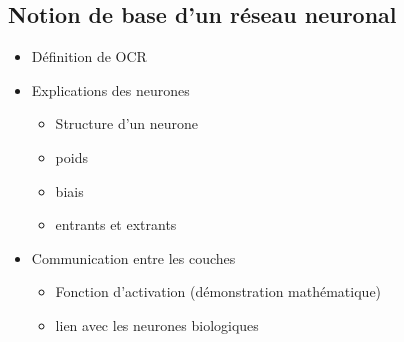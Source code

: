 \documentclass[letterpaper,10pt,french]{sphinxmanual}
\begin{document}
\subsection{Notion de base d’un réseau neuronal}
\label{\detokenize{plan:notion-de-base-d-un-reseau-neuronal}}\begin{itemize}
\item {} 
Définition de OCR

\item {} 
Explications des neurones
\begin{itemize}
\item {} 
Structure d’un neurone

\item {} 
poids

\item {} 
biais

\item {} 
entrants et extrants

\end{itemize}

\item {} 
Communication entre les couches
\begin{itemize}
\item {} 
Fonction d’activation (démonstration mathématique)

\item {} 
lien avec les neurones biologiques

\end{itemize}

\end{itemize}
\end{document}
